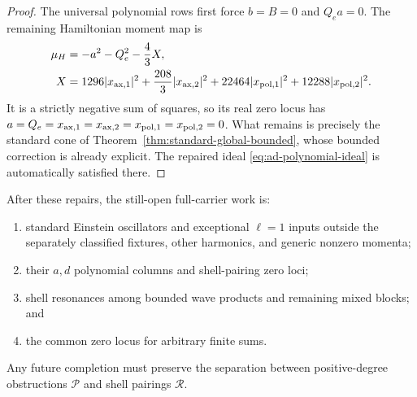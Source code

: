 \documentclass[11pt]{article}
\theoremstyle{definition}
\theoremstyle{remark}
\newcommand{\cP}{\mathcal P}
\newcommand{\cR}{\mathcal R}
\begin{document}
\begin{proof}
The universal polynomial rows first force \(b=B=0\) and \(Q_ea=0\).
The remaining Hamiltonian moment map is
\begin{align}
 \mu_H&=-a^2-Q_e^2-\frac43X,\\
 X&=1296|x_{\rm ax,1}|^2+\frac{208}{3}|x_{\rm ax,2}|^2
   +22464|x_{\rm pol,1}|^2+12288|x_{\rm pol,2}|^2.
\end{align}
It is a strictly negative sum of squares, so its real zero locus has
\(a=Q_e=x_{\rm ax,1}=x_{\rm ax,2}=x_{\rm pol,1}=x_{\rm pol,2}=0\).
What remains is precisely the standard cone of
Theorem~\ref{thm:standard-global-bounded}, whose bounded correction is already
explicit.  The repaired ideal
\eqref{eq:ad-polynomial-ideal} is automatically satisfied there.
\end{proof}

After these repairs, the still-open full-carrier work is:
\begin{enumerate}
\item standard Einstein oscillators and exceptional \(\ell=1\) inputs
      outside the separately classified fixtures, other harmonics, and
      generic nonzero momenta;
\item their \(a,d\) polynomial columns and shell-pairing zero loci;
\item shell resonances among bounded wave products and remaining mixed
      blocks; and
\item the common zero locus for arbitrary finite sums.
\end{enumerate}
Any future completion must preserve the separation between positive-degree
obstructions \(\cP\) and shell pairings \(\cR\).
\end{document}
